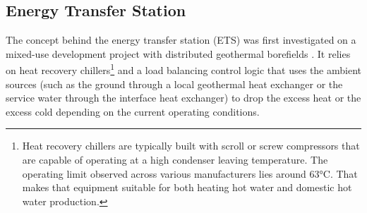 \subsection{Energy Transfer Station} \label{sec:ets}

The concept behind the energy transfer station (ETS) was first investigated on a mixed-use development project with distributed geothermal borefields \cite{Sidewalk} . It relies on heat recovery chillers\footnote{Heat recovery chillers are typically built with scroll or screw compressors that are capable of operating at a high condenser leaving temperature. The operating limit observed across various manufacturers lies around 63°C. That makes that equipment suitable for both heating hot water and domestic hot water production.} and a load balancing control logic that uses the ambient sources (such as the ground through a local geothermal heat exchanger or the service water through the interface heat exchanger) to drop the excess heat or the excess cold depending on the current operating conditions.

